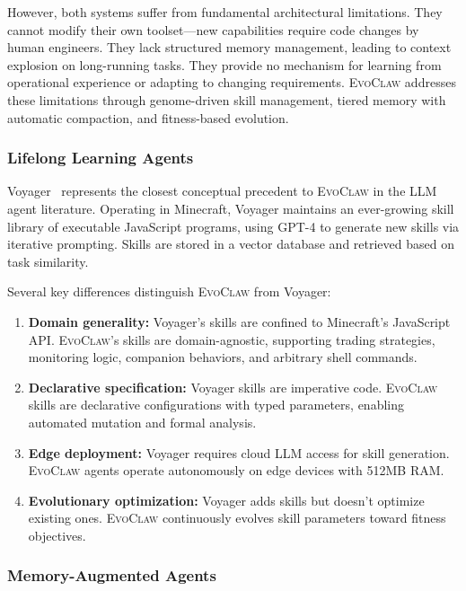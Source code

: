 \documentclass{article}
\newcommand{\evoclaw}{\textsc{EvoClaw}}
\begin{document}
However, both systems suffer from fundamental architectural limitations. They cannot modify their own toolset—new capabilities require code changes by human engineers. They lack structured memory management, leading to context explosion on long-running tasks. They provide no mechanism for learning from operational experience or adapting to changing requirements. \evoclaw{} addresses these limitations through genome-driven skill management, tiered memory with automatic compaction, and fitness-based evolution.

\subsubsection{Lifelong Learning Agents}

Voyager~\cite{wang2023voyager} represents the closest conceptual precedent to \evoclaw{} in the LLM agent literature. Operating in Minecraft, Voyager maintains an ever-growing skill library of executable JavaScript programs, using GPT-4 to generate new skills via iterative prompting. Skills are stored in a vector database and retrieved based on task similarity.

Several key differences distinguish \evoclaw{} from Voyager:

\begin{enumerate}[leftmargin=*]
    \item \textbf{Domain generality:} Voyager's skills are confined to Minecraft's JavaScript API. \evoclaw{}'s skills are domain-agnostic, supporting trading strategies, monitoring logic, companion behaviors, and arbitrary shell commands.
    
    \item \textbf{Declarative specification:} Voyager skills are imperative code. \evoclaw{} skills are declarative configurations with typed parameters, enabling automated mutation and formal analysis.
    
    \item \textbf{Edge deployment:} Voyager requires cloud LLM access for skill generation. \evoclaw{} agents operate autonomously on edge devices with 512MB RAM.
    
    \item \textbf{Evolutionary optimization:} Voyager adds skills but doesn't optimize existing ones. \evoclaw{} continuously evolves skill parameters toward fitness objectives.
\end{enumerate}

\subsubsection{Memory-Augmented Agents}
\end{document}
